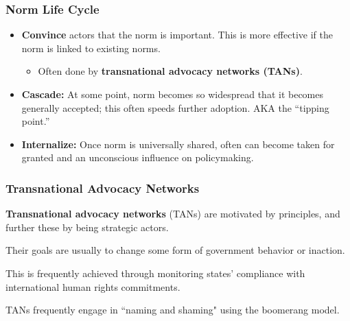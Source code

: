 \documentclass[handout]{beamer}
\begin{document}
\begin{frame} 
	\frametitle{\LARGE{Norm Life Cycle}}
	\begin{itemize}
		\item \textbf{Convince} actors that the norm is important. This is more effective if the norm is linked to existing norms. \pause
		\begin{itemize}
			\item Often done by \textbf{transnational advocacy networks (TANs)}. \pause
		\end{itemize}
		\item \textbf{Cascade:}	At some point, norm becomes so widespread that it becomes generally accepted; this often speeds further adoption. AKA the ``tipping point.” \pause
		\item \textbf{Internalize:} Once norm is universally shared, often can become taken for granted and an unconscious influence on policymaking.		
	\end{itemize}
\end{frame}

\begin{frame} 
	\frametitle{\LARGE{Transnational Advocacy Networks}}
	\begin{itemize}
		\large{
			\item \textbf{Transnational advocacy networks} (TANs) are motivated by principles, and further these by being strategic actors. \pause
			\item Their goals are usually to change some form of government behavior or inaction. \pause 

			\item This is frequently achieved through monitoring states' compliance with international human rights commitments. \pause 

			\item TANs frequently engage in ``naming and shaming" using the boomerang model.
		}
	\end{itemize}
\end{frame}
\end{document}
